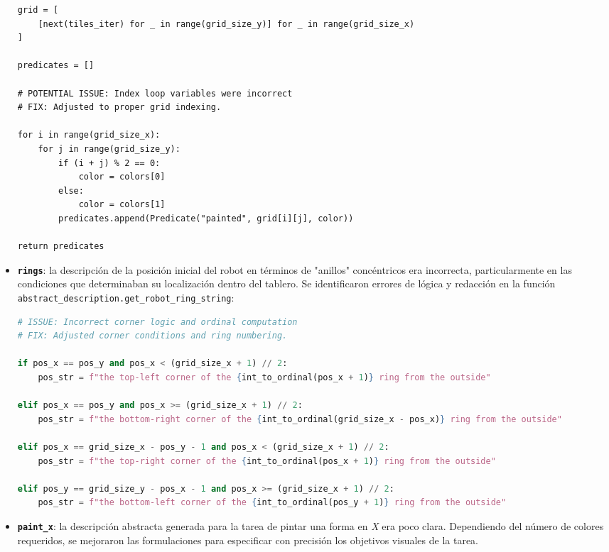 \begin{anexes}
\begin{itemize}
\begin{lstlisting}
grid = [
    [next(tiles_iter) for _ in range(grid_size_y)] for _ in range(grid_size_x)
]

predicates = []

# POTENTIAL ISSUE: Index loop variables were incorrect
# FIX: Adjusted to proper grid indexing.

for i in range(grid_size_x):
    for j in range(grid_size_y):
        if (i + j) % 2 == 0:
            color = colors[0]
        else:
            color = colors[1]
        predicates.append(Predicate("painted", grid[i][j], color))

return predicates
\end{lstlisting}

    \item \textbf{\texttt{rings}}: la descripción de la posición inicial del robot en términos de "anillos" concéntricos era incorrecta, particularmente en las condiciones que determinaban su localización dentro del tablero. Se identificaron errores de lógica y redacción en la función \texttt{abstract\_description.get\_robot\_ring\_string}:

\begin{lstlisting}[language=Python, caption={Corrección de condiciones y redacción en \texttt{get\_robot\_ring\_string}}, label={lst:robot_ring_fix}, basicstyle=\ttfamily\small, frame=single]
# ISSUE: Incorrect corner logic and ordinal computation
# FIX: Adjusted corner conditions and ring numbering.

if pos_x == pos_y and pos_x < (grid_size_x + 1) // 2:
    pos_str = f"the top-left corner of the {int_to_ordinal(pos_x + 1)} ring from the outside"

elif pos_x == pos_y and pos_x >= (grid_size_x + 1) // 2:
    pos_str = f"the bottom-right corner of the {int_to_ordinal(grid_size_x - pos_x)} ring from the outside"

elif pos_x == grid_size_x - pos_y - 1 and pos_x < (grid_size_x + 1) // 2:
    pos_str = f"the top-right corner of the {int_to_ordinal(pos_x + 1)} ring from the outside"

elif pos_y == grid_size_y - pos_x - 1 and pos_x >= (grid_size_x + 1) // 2:
    pos_str = f"the bottom-left corner of the {int_to_ordinal(pos_y + 1)} ring from the outside"
\end{lstlisting}

    \item \textbf{\texttt{paint\_x}}: la descripción abstracta generada para la tarea de pintar una forma en \textit{X} era poco clara. Dependiendo del número de colores requeridos, se mejoraron las formulaciones para especificar con precisión los objetivos visuales de la tarea.


\end{itemize}
\end{anexes}
